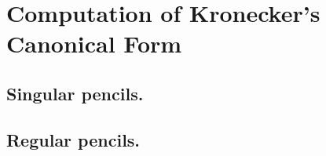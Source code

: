 \section{Computation of Kronecker's Canonical Form}

\subsection*{Singular pencils.}

\subsection*{Regular pencils.}